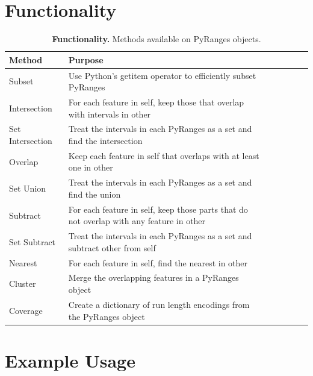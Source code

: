 \documentclass[10pt,letterpaper]{article}
\begin{document}
\section*{Functionality}

\begin{table}[!ht]
\begin{adjustwidth}{-1.5in}{0in}
\centering
\caption{{\bf Functionality.} Methods available on PyRanges objects.}
\begin{tabular}{|l|l|l|l|l|l|l|}
\hline
  {\bf Method} & {\bf Purpose} \\ \hline
  Subset & Use Python's getitem operator to efficiently subset PyRanges \\ \hline
  Intersection & For each feature in self, keep those that overlap with intervals in other \footnotemark \\ \hline
  Set Intersection & Treat the intervals in each PyRanges as a set and find the intersection \footnotemark \\ \hline
  Overlap & Keep each feature in self that overlaps with at least one in other \\ \hline
  Set Union & Treat the intervals in each PyRanges as a set and find the union \\ \hline
  Subtract & For each feature in self, keep those parts that do not overlap with any feature in other \\ \hline
  Set Subtract & Treat the intervals in each PyRanges as a set and subtract other from self \\ \hline
  Nearest & For each feature in self, find the nearest in other \\ \hline
  Cluster & Merge the overlapping features in a PyRanges object \\ \hline
  Coverage & Create a dictionary of run length encodings from the PyRanges object \\ \hline
\end{tabular}
\label{tab1}
\end{adjustwidth}
\end{table}




\section*{Example Usage}


\end{document}
